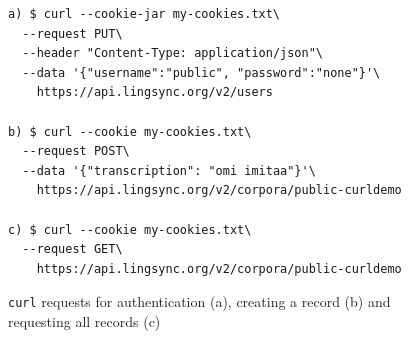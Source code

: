 \documentclass[11pt]{article}
\begin{document}
\begin{figure}[h]
\scriptsize

\begin{verbatim}
a) $ curl --cookie-jar my-cookies.txt\
  --request PUT\
  --header "Content-Type: application/json"\
  --data '{"username":"public", "password":"none"}'\
    https://api.lingsync.org/v2/users

b) $ curl --cookie my-cookies.txt\
  --request POST\
  --data '{"transcription": "omi imitaa"}'\
    https://api.lingsync.org/v2/corpora/public-curldemo

c) $ curl --cookie my-cookies.txt\
  --request GET\
    https://api.lingsync.org/v2/corpora/public-curldemo
\end{verbatim}
\caption{\texttt{curl} requests for authentication (a), creating a record (b) and requesting all records (c) }
\normalsize
\label{fig:api-basic}
\end{figure}
\end{document}
